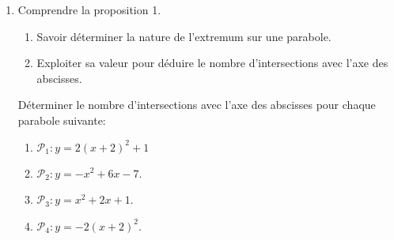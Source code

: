 \documentclass[a4paper,11pt]{article}
\theoremstyle{break}
\begin{document}
  \begin{Dev*}
    
    \begin{enumerate}
      
      \item Comprendre la proposition 1.
      \begin{enumerate}
	\item Savoir déterminer la nature de l'extremum sur une parabole.
	\item Exploiter sa valeur pour déduire le nombre d'intersections 
	avec l'axe des abscisses.
	
      \end{enumerate}
      
      \vspace{0.5cm}
      
      \begin{dm}
	
	Déterminer le nombre d'intersections avec l'axe des abscisses pour chaque parabole
	suivante:
	\begin{enumerate}
	  \item $\mathcal{P}_1:y=2(x+2)^2+1$
	  \item $\mathcal{P}_2:y=-x^2+6x-7$.%
	  \item $\mathcal{P}_3:y=x^2+2x+1$.
	  \item $\mathcal{P}_4:y=-2(x+2)^2$.
	\end{enumerate} 
      \end{dm}
      
      
      
    \end{enumerate}
  \end{Dev*}
  
\end{document}
